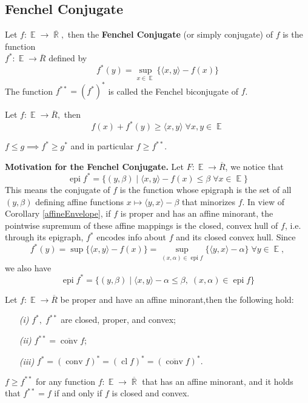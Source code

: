 \documentclass{tufte-handout}
\DeclareMathOperator{\cl}{cl}
\DeclareMathOperator{\epi}{epi}
\DeclareMathOperator{\R}{\mathbb{R}}
\DeclareMathOperator{\E}{\mathbb{E}}
\DeclareMathOperator{\conv}{conv}
\begin{document}
{    \subsection{Fenchel Conjugate}%
      \label{sub:Fenchel Conjugate}
      \begin{definition}
        Let $f: \E \to \overline{\R},$ then the \textbf{Fenchel Conjugate} (or simply conjugate) of $f$ is the function \\ $f^* : \E \to\overline{R}$ defined by 
        $$f^* (y) = \sup _{x \in \E} \{ \langle x,y \rangle - f(x) \} $$
        The function $f^{**} = (f^*)^*$ is called the Fenchel biconjugate of $f$. 
      \end{definition}
      \begin{proposition}
        Let $f: \E \to \overline{R},$ then  
        $$f(x) + f^*(y) \geq \langle x,y \rangle \; \forall x,y \in \E $$
      \end{proposition}
      \begin{remark} 
        $f\leq g \implies f^* \geq g^* $ and in particular $f\geq f^{**}$.
      \end{remark}
      \noindent \textbf{Motivation for the Fenchel Conjugate.} Let $F: \E \to \overline{R}$, we notice that 
      $$\epi f^* = \{(y, \beta) \mid \langle x, y \rangle - f(x) \leq \beta \; \forall x \in \E\} $$
      This means the conjugate of $f$ is the function whose epigraph is the set
of all $(y, \beta )$ defining affine functions $x \mapsto \langle y, x \rangle - \beta$  that minorizes $f$. In view of Corollary \ref{affineEnvelope}, if $f$ is proper and has an affine minorant, the pointwise supremum of these affine mappings is the closed, convex
hull of $f$, i.e. through its epigraph, $f^*$ encodes info about $f$ and its
closed convex hull. Since $$f^* (y) = \sup \{ \langle x,y \rangle -f(x) \} = \sup_{(x, \alpha) \in \epi f} \{\langle y, x \rangle - \alpha \} \; \forall y\in \E,$$ we also have 
$$\epi f^* = \{(y, \beta) \mid \langle x,y \rangle - \alpha \leq \beta , \; (x, \alpha)\in \epi f\} $$
\begin{theorem} Let $f: \E \to \overline{R}$ be proper and have an affine minorant,then the following hold: 
  \begin{enumerate}
    \item[\it (i)] $f^*, \; f^{**}$ are closed, proper, and convex; 
    \item[\it (ii)] $f^{**} = \overline{\conv} f$;
    \item[\it (iii)] $f^* = (\conv f)^* = (\cl f)^* = (\overline{\conv}f)^*.$
  \end{enumerate}
\end{theorem}
\begin{remark} 
  $f\geq f^{**}$ for any function $f: \E \to \overline{\R}$ that has an affine minorant, and it holds that $f^{**} = f$ if and only if $f$ is closed and convex. 
\end{remark}

}
\end{document}
